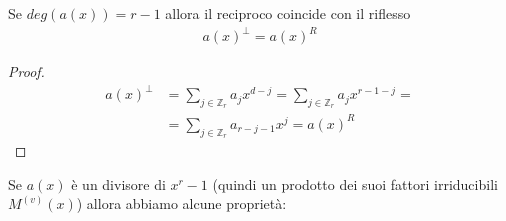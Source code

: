 \begin{prop}
   Se $deg(a(x)) = r-1$ allora il reciproco coincide con il riflesso
   \begin{align*}
      a(x)^{\perp}=a(x)^{R}
   \end{align*}
\end{prop}
\begin{proof}
    \begin{align*}
     a(x)^{\perp}  &= \sum_{j \in \mathbb{Z}_{r}} a_{j}x^{d-j} = \sum_{j \in \mathbb{Z}_{r}} a_{j}x^{r-1-j} = \\
                   &= \sum_{j \in \mathbb{Z}_{r}} a_{r-j-1}x^{j}  = a(x)^{R}
   \end{align*}
\end{proof}
Se $a(x)$ è un divisore di $x^r - 1$ (quindi un prodotto dei suoi fattori irriducibili $M^{(v)}(x)$) allora abbiamo alcune proprietà:


